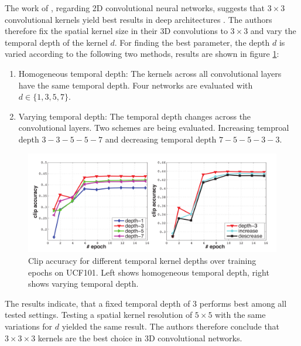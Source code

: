 The work of \textcite{simonyan_very_2014}, regarding 2D convolutional neural networks, suggests that $3\times3$ convolutional kernels yield best results in deep architectures .
The authors therefore fix the spatial kernel size in their 3D convolutions to $3\times3$ and vary the temporal depth of the kernel $d$.
For finding the best parameter, the depth $d$ is varied according to the following two methods, results are shown in figure \ref{fig:c3d_temporaldeptheval}:
\begin{enumerate}
    \item Homogeneous temporal depth: The kernels across all convolutional layers have the same temporal depth. Four networks are evaluated with $d \in \{1, 3, 5, 7\}$.
    \item Varying temporal depth: The temporal depth changes across the convolutional layers. Two schemes are being evaluated. Increasing temproal depth $3-3-5-5-7$ and decreasing temporal depth $7-5-5-3-3$.
\end{enumerate}

\begin{figure}[H]
    \centering
    \includegraphics[width=\textwidth]{img_deep/c3d_temporaldeptheval}
    \caption{Clip accuracy for different temporal kernel depths over training epochs on UCF101. Left shows homogeneous temporal depth, right shows varying temporal depth. \cite{tran_learning_2015}}
    \label{fig:c3d_temporaldeptheval}
\end{figure}

The results indicate, that a fixed temporal depth of 3 performs best among all tested settings.
Testing a spatial kernel resolution of $5\times5$ with the same variations for $d$ yielded the same result.
The authors therefore conclude that $3\times3\times3$ kernels are the best choice in 3D convolutional networks.

